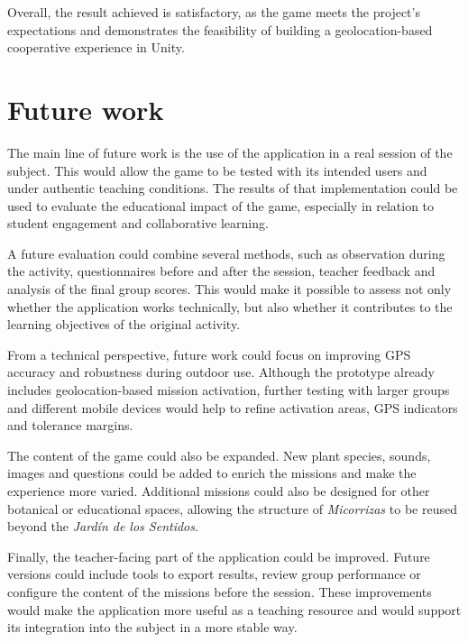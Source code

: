 Overall, the result achieved is satisfactory, as the game meets the project’s expectations and demonstrates the feasibility of building a geolocation-based cooperative experience in Unity.


\section{Future work}
The main line of future work is the use of the application in a real session of the subject. This would allow the game to be tested with its intended users and under authentic teaching conditions. The results of that implementation could be used to evaluate the educational impact of the game, especially in relation to student engagement and collaborative learning.

A future evaluation could combine several methods, such as observation during the activity, questionnaires before and after the session, teacher feedback and analysis of the final group scores. This would make it possible to assess not only whether the application works technically, but also whether it contributes to the learning objectives of the original activity.

From a technical perspective, future work could focus on improving GPS accuracy and robustness during outdoor use. Although the prototype already includes geolocation-based mission activation, further testing with larger groups and different mobile devices would help to refine activation areas, GPS indicators and tolerance margins.

The content of the game could also be expanded. New plant species, sounds, images and questions could be added to enrich the missions and make the experience more varied. Additional missions could also be designed for other botanical or educational spaces, allowing the structure of \textit{Micorrizas} to be reused beyond the \textit{Jardín de los Sentidos}.

Finally, the teacher-facing part of the application could be improved. Future versions could include tools to export results, review group performance or configure the content of the missions before the session. These improvements would make the application more useful as a teaching resource and would support its integration into the subject in a more stable way.
